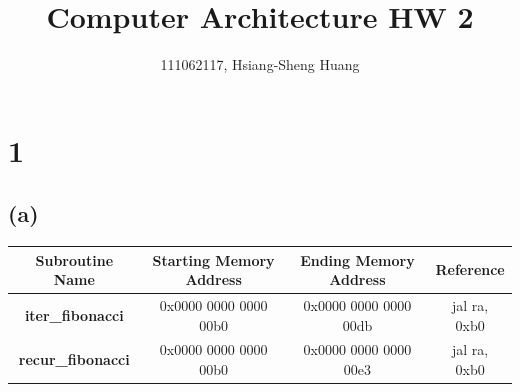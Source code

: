 \documentclass[12pt]{article}
\title{Computer Architecture HW 2}
\author{111062117, Hsiang-Sheng Huang}
\begin{document}
\maketitle

\section*{1}

\subsection*{(a)}

\begin{table}[H]
    \centering
    \begin{tabular}{|c|c|c|c|}
    \hline
    Subroutine Name & Starting Memory Address & Ending Memory Address & Reference \\
    \hline
    \textbf{iter\_fibonacci} & 0x0000 0000 0000 00b0 & 0x0000 0000 0000 00db &  jal ra, 0xb0 \\
    \hline
    \textbf{recur\_fibonacci} & 0x0000 0000 0000 00b0 & 0x0000 0000 0000 00e3 & jal ra, 0xb0 \\
    \hline
    \end{tabular}
\end{table}
\end{document}

